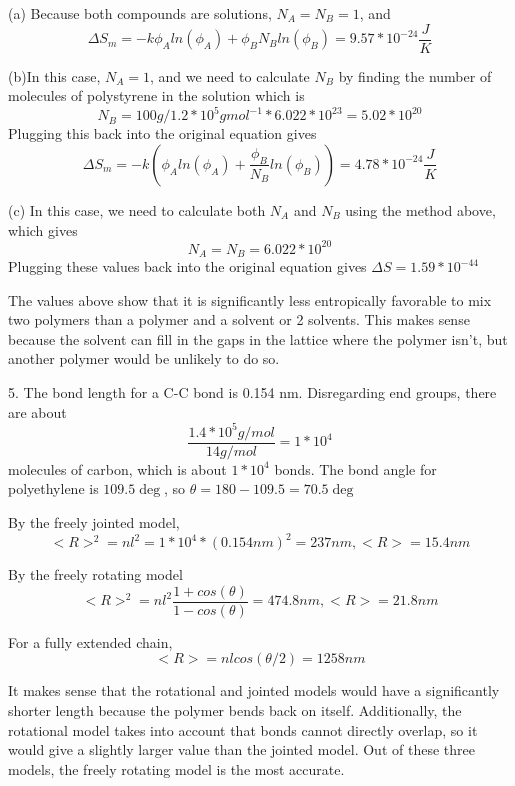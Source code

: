 \documentclass{article}
\begin{document}
(a) Because both compounds are solutions, $N_A=N_B=1$, and 
$$\Delta S_m = -k\phi_Aln(\phi_A)+\phi_B{N_B}ln(\phi_B)=9.57*10^{-24}\frac{J}{K}$$

(b)In this case, $N_A=1$, and we need to calculate $N_B$ by finding the number of molecules of polystyrene in the solution which is
$$N_B=100g/1.2*10^5gmol^{-1}*6.022*10^{23}=5.02*10^{20}$$
Plugging this back into the original equation gives 
$$\Delta S_m = -k\left(\phi_Aln(\phi_A)+\frac{\phi_B}{N_B}ln(\phi_B)\right)=4.78*10^{-24}\frac{J}{K}$$

(c) In this case, we need to calculate both $N_A$ and $N_B$ using the method above, which gives
$$N_A=N_B=6.022*10^{20}$$
Plugging these values back into the original equation gives $\Delta S = 1.59*10^{-44}$

The values above show that it is significantly less entropically favorable to mix two polymers than a polymer and a solvent or 2 solvents. This makes sense because the solvent can fill in the gaps in the lattice where the polymer isn't, but another polymer would be unlikely to do so.

5. The bond length for a C-C bond is 0.154 nm. Disregarding end groups, there are about 
$$\frac{1.4*10^5 g/mol}{14 g/mol} = 1*10^4$$
molecules of carbon, which is about $1*10^4$ bonds. The bond angle for polyethylene is $109.5\deg$, so $\theta = 180-109.5=70.5 \deg$

By the freely jointed model,
$$<R>^2=nl^2=1*10^4*(0.154 nm)^2=237 nm, <R> = 15.4 nm$$

By the freely rotating model
$$<R>^2=nl^2\frac{1+cos(\theta)}{1-cos(\theta)}=474.8 nm, <R>=21.8 nm$$

For a fully extended chain,
$$<R>=nlcos(\theta/2)=1258 nm$$

It makes sense that the rotational and jointed models would have a significantly shorter length because the polymer bends back on itself. Additionally, the rotational model takes into account that bonds cannot directly overlap, so it would give a slightly larger value than the jointed model. Out of these three models, the freely rotating model is the most accurate.
\end{document}
